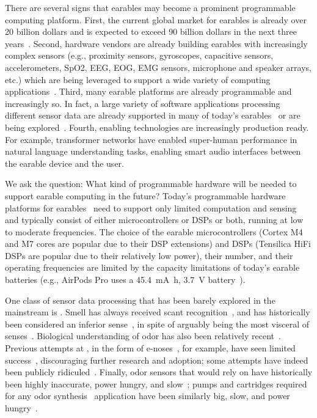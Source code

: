There are several signs that earables may become a prominent programmable
computing platform.  First, the current global market for earables is already
over 20 billion dollars and is expected to exceed 90 billion dollars in the
next three years~\cite{}. Second, hardware vendors are already building
earables with increasingly complex sensors (e.g., proximity sensors,
gyroscopes, capacitive sensors, accelerometers, SpO2, EEG, EOG, EMG sensors,
microphone and speaker arrays, etc.) which are being leveraged to support a
wide variety of computing applications~\cite{}.  Third, many earable platforms
are already programmable and increasingly so.  In fact, a large variety of
software applications processing different sensor data are already supported in
many of today's earables~\cite{} or are being explored~\cite{}.  Fourth,
enabling technologies are increasingly production ready.  For example,
transformer networks have enabled super-human performance in natural language
understanding tasks, enabling smart audio interfaces between the earable device
and the user.



We ask the question: What kind of programmable hardware will be needed to
support earable computing in the future?  Today's programmable hardware
platforms for earables~\cite{} need to support only limited computation and
sensing and typically consist of either microcontrollers or DSPs or both,
running at low to moderate frequencies. The choice of the earable
microcontrollers (Cortex M4 and M7 cores are popular due to their DSP
extensions) and DSPs (Tensilica HiFi DSPs are popular due to their relatively
low power), their number, and their operating frequencies are limited by the
capacity limitations of today's earable batteries (e.g., AirPods Pro uses a
\SI{45.4}{\milli\ampere\hour}, \SI{3.7}{\volt} battery~\cite{}).


One class of sensor data processing that has been barely explored in the
mainstream is {\em \olfc{}}.  Smell has always received scant
recognition~\cite{rouby2002olfaction}, and has historically been considered an
inferior sense~\cite{rouby2002olfaction}, in spite of arguably being the most
visceral of senses~\cite{stewart_2022}. Biological understanding of odor has
also been relatively recent~\cite{nobelprize.org_2004}. Previous attempts at \olfc{}, in
the form of e-noses~\cite{karakaya2020electronic}, for example, have seen
limited success~\cite{smith_kiger_2006, platt_1999}, discouraging further
research and adoption; some attempts have indeed been publicly
ridiculed~\cite{smith_kiger_2006}. Finally, odor sensors that \olfc{} would
rely on have historically been highly inaccurate, power hungry, and
slow~\cite{wilson2016recent}; pumps and cartridges required for any odor
synthesis~\cite{olorama_technology, aromajoin_corporation, tillotson2006scent,
amores2017essence, anthrotronix_2019} application have been similarly big,
slow, and power hungry~\cite{mielle2022cold, solis2005fluctuation, maritex}.

